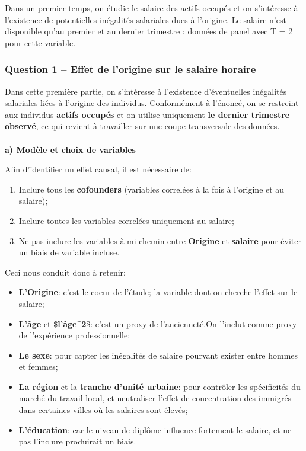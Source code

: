 \documentclass[
  letterpaper,
  DIV=11,
  numbers=noendperiod]{scrartcl}
\makeatletter
\let\oldparagraph\paragraph
\renewcommand{\paragraph}{
    \@ifstar
      \xxxParagraphStar
      \xxxParagraphNoStar
  }
\newcommand{\xxxParagraphStar}[1]{\oldparagraph*{#1}\mbox{}}
\newcommand{\xxxParagraphNoStar}[1]{\oldparagraph{#1}\mbox{}}
\makeatother
\begin{document}
Dans un premier temps, on étudie le salaire des actifs occupés et on
s'intéresse à l'existence de potentielles inégalités salariales dues à
l'origine. Le salaire n'est disponible qu'au premier et au dernier
trimestre : données de panel avec T = 2 pour cette variable.

\subsubsection{Question 1 -- Effet de l'origine sur le salaire
horaire}\label{question-1-effet-de-lorigine-sur-le-salaire-horaire}

Dans cette première partie, on s'intéresse à l'existence d'éventuelles
inégalités salariales liées à l'origine des individus. Conformément à
l'énoncé, on se restreint aux individus \textbf{actifs occupés} et on
utilise uniquement \textbf{le dernier trimestre observé}, ce qui revient
à travailler sur une coupe transversale des données.

\paragraph{\texorpdfstring{\textbf{a) Modèle et choix de
variables}}{a) Modèle et choix de variables}}\label{a-moduxe8le-et-choix-de-variables}

Afin d'identifier un effet causal, il est nécessaire de:

\begin{enumerate}
\def\labelenumi{\arabic{enumi}.}
\item
  Inclure tous les \textbf{cofounders} (variables correlées à la fois à
  l'origine et au salaire);
\item
  Inclure toutes les variables correlées uniquement au salaire;
\item
  Ne pas inclure les variables à mi-chemin entre \textbf{Origine} et
  \textbf{salaire} pour éviter un biais de variable incluse.
\end{enumerate}

Ceci nous conduit donc à retenir:

\begin{itemize}
\item
  \textbf{L'Origine}: c'est le coeur de l'étude; la variable dont on
  cherche l'effet sur le salaire;
\item
  \textbf{L'âge} et \$\textbf{l'âge\^{}2}\$: c'est un proxy de
  l'ancienneté.On l'inclut comme proxy de l'expérience professionnelle;
\item
  \textbf{Le sexe}: pour capter les inégalités de salaire pourvant
  exister entre hommes et femmes;
\item
  \textbf{La région} et la \textbf{tranche d'unité urbaine}: pour
  contrôler les spécificités du marché du travail local, et neutraliser
  l'effet de concentration des immigrés dans certaines villes où les
  salaires sont élevés;
\item
  \textbf{L'éducation}: car le niveau de diplôme influence fortement le
  salaire, et ne pas l'inclure produirait un biais.
\end{itemize}
\end{document}
